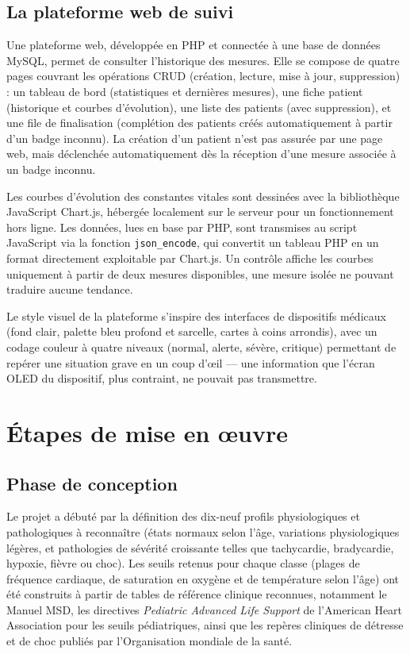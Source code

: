 \documentclass[12pt,a4paper]{report}
\begin{document}
\subsection*{La plateforme web de suivi}
Une plateforme web, développée en PHP et connectée à une base de données MySQL, permet de consulter l'historique des mesures. Elle se compose de quatre pages couvrant les opérations CRUD (création, lecture, mise à jour, suppression) : un tableau de bord (statistiques et dernières mesures), une fiche patient (historique et courbes d'évolution), une liste des patients (avec suppression), et une file de finalisation (complétion des patients créés automatiquement à partir d'un badge inconnu). La création d'un patient n'est pas assurée par une page web, mais déclenchée automatiquement dès la réception d'une mesure associée à un badge inconnu.

Les courbes d'évolution des constantes vitales sont dessinées avec la bibliothèque JavaScript Chart.js, hébergée localement sur le serveur pour un fonctionnement hors ligne. Les données, lues en base par PHP, sont transmises au script JavaScript via la fonction \texttt{json\_encode}, qui convertit un tableau PHP en un format directement exploitable par Chart.js. Un contrôle affiche les courbes uniquement à partir de deux mesures disponibles, une mesure isolée ne pouvant traduire aucune tendance.

Le style visuel de la plateforme s'inspire des interfaces de dispositifs médicaux (fond clair, palette bleu profond et sarcelle, cartes à coins arrondis), avec un codage couleur à quatre niveaux (normal, alerte, sévère, critique) permettant de repérer une situation grave en un coup d'œil — une information que l'écran OLED du dispositif, plus contraint, ne pouvait pas transmettre.

\section{Étapes de mise en œuvre}

\subsection*{Phase de conception}
Le projet a débuté par la définition des dix-neuf profils physiologiques et pathologiques à reconnaître (états normaux selon l'âge, variations physiologiques légères, et pathologies de sévérité croissante telles que tachycardie, bradycardie, hypoxie, fièvre ou choc). Les seuils retenus pour chaque classe (plages de fréquence cardiaque, de saturation en oxygène et de température selon l'âge) ont été construits à partir de tables de référence clinique reconnues, notamment le Manuel MSD, les directives \textit{Pediatric Advanced Life Support} de l'American Heart Association pour les seuils pédiatriques, ainsi que les repères cliniques de détresse et de choc publiés par l'Organisation mondiale de la santé.
\end{document}
